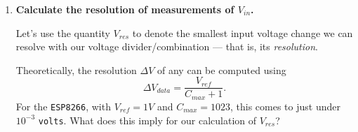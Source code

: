 \begin{enumerate}
	\item \textbf{Calculate the resolution of \adc measurements of $V_{in}$.}

	Let's use the quantity $V_{res}$ to denote the smallest input voltage change we can resolve with our voltage divider/\adc combination --- that is, its \emph{resolution}.

	\smallskip
	Theoretically, the resolution $\Delta V$ of any \adc can be computed using 
	\begin{equation}\label{resolution}
	\Delta V_{data} = \frac{V_{ref}}{C_{max}+1}.
	\end{equation}
	For the \texttt{ESP8266}, with $V_{ref}= 1 \si{V}$ and $C_{max} = 1023$, this comes to just under $10^{-3}$ \texttt{volts}.
	What does this imply for our calculation of  $V_{res}$?


\end{enumerate}
